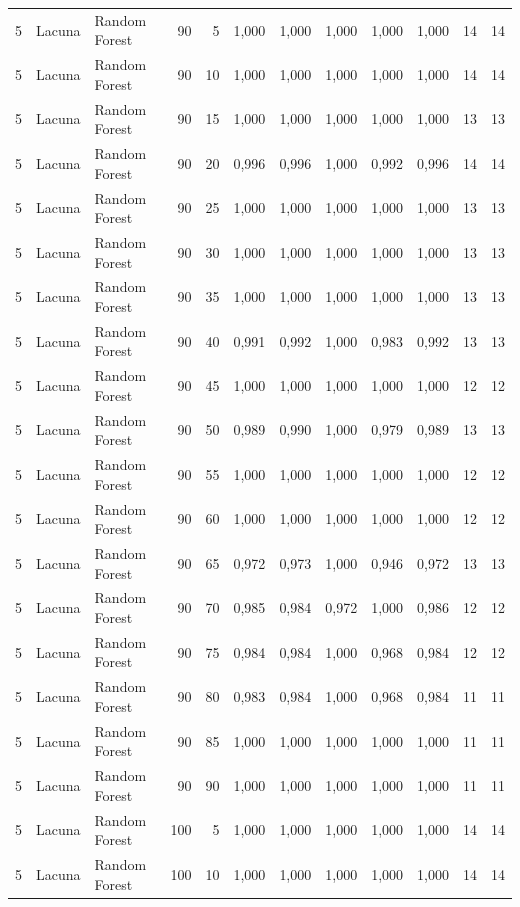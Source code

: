 \begin{longtable}{@{}rllrrrrrrrrr@{}}
5 & Lacuna & Random Forest & 90 & 5 & 1,000 & 1,000 & 1,000 & 1,000 & 1,000 & 14 & 14 \\
5 & Lacuna & Random Forest & 90 & 10 & 1,000 & 1,000 & 1,000 & 1,000 & 1,000 & 14 & 14 \\
5 & Lacuna & Random Forest & 90 & 15 & 1,000 & 1,000 & 1,000 & 1,000 & 1,000 & 13 & 13 \\
5 & Lacuna & Random Forest & 90 & 20 & 0,996 & 0,996 & 1,000 & 0,992 & 0,996 & 14 & 14 \\
5 & Lacuna & Random Forest & 90 & 25 & 1,000 & 1,000 & 1,000 & 1,000 & 1,000 & 13 & 13 \\
5 & Lacuna & Random Forest & 90 & 30 & 1,000 & 1,000 & 1,000 & 1,000 & 1,000 & 13 & 13 \\
5 & Lacuna & Random Forest & 90 & 35 & 1,000 & 1,000 & 1,000 & 1,000 & 1,000 & 13 & 13 \\
5 & Lacuna & Random Forest & 90 & 40 & 0,991 & 0,992 & 1,000 & 0,983 & 0,992 & 13 & 13 \\
5 & Lacuna & Random Forest & 90 & 45 & 1,000 & 1,000 & 1,000 & 1,000 & 1,000 & 12 & 12 \\
5 & Lacuna & Random Forest & 90 & 50 & 0,989 & 0,990 & 1,000 & 0,979 & 0,989 & 13 & 13 \\
5 & Lacuna & Random Forest & 90 & 55 & 1,000 & 1,000 & 1,000 & 1,000 & 1,000 & 12 & 12 \\
5 & Lacuna & Random Forest & 90 & 60 & 1,000 & 1,000 & 1,000 & 1,000 & 1,000 & 12 & 12 \\
5 & Lacuna & Random Forest & 90 & 65 & 0,972 & 0,973 & 1,000 & 0,946 & 0,972 & 13 & 13 \\
5 & Lacuna & Random Forest & 90 & 70 & 0,985 & 0,984 & 0,972 & 1,000 & 0,986 & 12 & 12 \\
5 & Lacuna & Random Forest & 90 & 75 & 0,984 & 0,984 & 1,000 & 0,968 & 0,984 & 12 & 12 \\
5 & Lacuna & Random Forest & 90 & 80 & 0,983 & 0,984 & 1,000 & 0,968 & 0,984 & 11 & 11 \\
5 & Lacuna & Random Forest & 90 & 85 & 1,000 & 1,000 & 1,000 & 1,000 & 1,000 & 11 & 11 \\
5 & Lacuna & Random Forest & 90 & 90 & 1,000 & 1,000 & 1,000 & 1,000 & 1,000 & 11 & 11 \\
5 & Lacuna & Random Forest & 100 & 5 & 1,000 & 1,000 & 1,000 & 1,000 & 1,000 & 14 & 14 \\
5 & Lacuna & Random Forest & 100 & 10 & 1,000 & 1,000 & 1,000 & 1,000 & 1,000 & 14 & 14 \\

\end{longtable}
